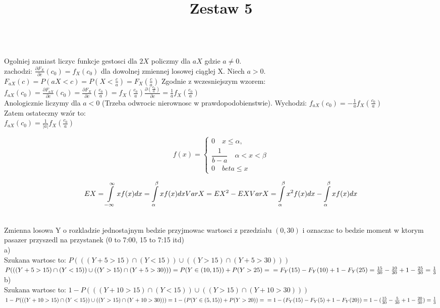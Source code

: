 \documentclass[fleqn]{article}
\begin{document}
\title{Zestaw 5}
\date{}
\medskip
{}
\medskip
\\
Ogolniej zamiast liczyc funkcje gestosci dla $2X$ policzmy dla $aX$ gdzie $a\neq 0$.\\
zachodzi: $\frac{\partial F_{X} }{\partial c}(c_{0})=f_{X}(c_{0})$ dla dowolnej zmiennej losowej ciąglej X. Niech $ a>0$.\\
$F_{aX}(c)=P(aX< c)=P(X<\frac{c}{a})=F_{X}(\frac{c}{a})$ Zgodnie z wczesniejszym wzorem:\\
$f_{aX}(c_0)=\frac{\partial F_{aX} }{\partial c}(c_{0})=\frac{\partial F_{X} }{\partial c}(\frac{c_{0}}{a})=f_{X}(\frac{c_{0}}{a})\frac{\partial (\frac{c_{0}}{a}) }{\partial c}=\frac{1}{a}f_{X}(\frac{c_{0}}{a})$\\
Anologicznie liczymy dla $a<0$ (Trzeba odwrocic nierownosc w prawdopodobienstwie). Wychodzi: $f_{aX}(c_0)=-\frac{1}{a}f_{X}(\frac{c_{0}}{a})$\\ Zatem ostateczny wzór to:\\
 $f_{aX}(c_0)=\frac{1}{|a|}f_{X}(\frac{c_{0}}{a})$


\medskip

\medskip

$$
f(x)=
\begin{cases}
0 \quad x \leq \alpha,\\
\dfrac{1}{b-a} \quad \alpha < x < \beta\\
0 \quad beta \leq x
\end{cases}
$$

$$ EX = \int\limits_{-\infty}^{\infty} xf(x)dx = 
 \int\limits_{\alpha}^{\beta} xf(x)dx \\
VarX = EX^2 - EX \\
VarX = \int\limits_{\alpha}^{\beta} x^2 f(x)dx - \int\limits_{\alpha}^{\beta} xf(x)dx 
$$

\medskip
\\
Zmienna losowa Y o rozkladzie jednostajnym bedzie przyjmowac wartosci z przedziału $(0,30)$ i oznaczac to bedzie moment w ktorym pasazer przyszedl na przystanek (0 to 7:00, 15 to 7:15 itd)\\
a)\\
Szukana wartosc to: $P(((Y+5>15)\cap(Y<15))\cup((Y>15)\cap(Y+5>30)) )$ \\
$ P(((Y+5>15)\cap(Y<15))\cup((Y>15)\cap(Y+5>30)) )=P(Y\in(10,15))+P(Y>25)=\\
=F_{Y}(15)-F_{Y}(10)+1-F_{Y}(25)=\frac{15}{30}-\frac{10}{30}+1-\frac{25}{30}=\frac{1}{3}$\\
b)\\
Szukana wartosc to: $1-P(((Y+10>15)\cap(Y<15))\cup((Y>15)\cap(Y+10>30)) )$ \\
$ 1-P(((Y+10>15)\cap(Y<15))\cup((Y>15)\cap(Y+10>30)) )=1-(P(Y\in(5,15))+P(Y>20))=\\
=1-(F_{Y}(15)-F_{Y}(5)+1-F_{Y}(20))=1-(\frac{15}{30}-\frac{5}{30}+1-\frac{20}{30})=\frac{1}{3}$\\


\medskip
\end{document}
